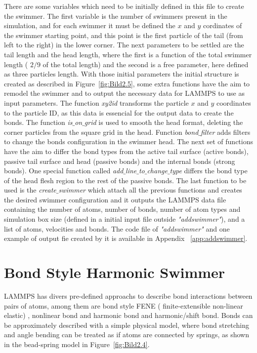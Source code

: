 There are some variables which need to be initially defined in this file to create the swimmer. The first variable is the number of swimmers present in the simulation, and for each swimmer
it must be defined the $x$ and $y$ cordinates of the swimmer starting point, and this point is the first particle of the tail (from left to the right) in the lower corner.
The next parameters to be settled are the tail length and the head length, where the first is a function of the total swimmer length ( $2/9$ of the total length) and the second is
a free parameter, here defined as three particles length. With those initial parameters the initial structure is created as described in Figure~\ref{fig:Bild2.5}, some extra functions
have the aim to remodel the swimmer and to output the necessary data for LAMMPS to use as input parameters. The function \textit{xy2id} transforms the particle $x$ and $y$ coordinates
to the particle ID, as this data is essencial for the output data to create the bonds. The function \textit{is$\_$on$\_$grid} is used to smooth the head format, deleting the corner
particles from the square grid in the head. Function \textit{bond$\_$filter} adds filters to change the bonds configuration in the swimmer head. The next set of functions have the aim
to differ the bond types from the active tail surface (active bonds), passive tail surface and head (passive bonds) and the internal bonds (strong bonds). One special function called
\textit{add$\_$line$\_$to$\_$change$\_$type} differs the bond type of the head flesh region to the rest of the passive bonds. The last function to be used is the \textit{create$\_$swimmer}
which attach all the previous functions and creates the desired swimmer configuration and it outputs the LAMMPS data file containing the number of atoms, number of bonds, number of 
atom types and simulation box size (defined in a initial input file outside \textit{"addswimmer"}), and a list of atoms, velocities and bonds. The code file of \textit{"addswimmer"}
and one example of output fie created by it is available in Appendix ~\ref{app:addswimmer}.

\section{Bond Style Harmonic Swimmer}
\label{sec:section 3}

LAMMPS has divers pre-defined approachs to describe bond interactions between pairs of atoms, among them are bond style FENE ( finite-extensible non-linear elastic) , nonlinear bond and
harmonic bond and harmonic/shift bond. Bonds can be approximately described with a simple physical model, where bond stretching and angle bending can be treated as if atoms are connected by springs, as
shown in the bead-spring model in Figure~\ref{fig:Bild2.4}.\par

